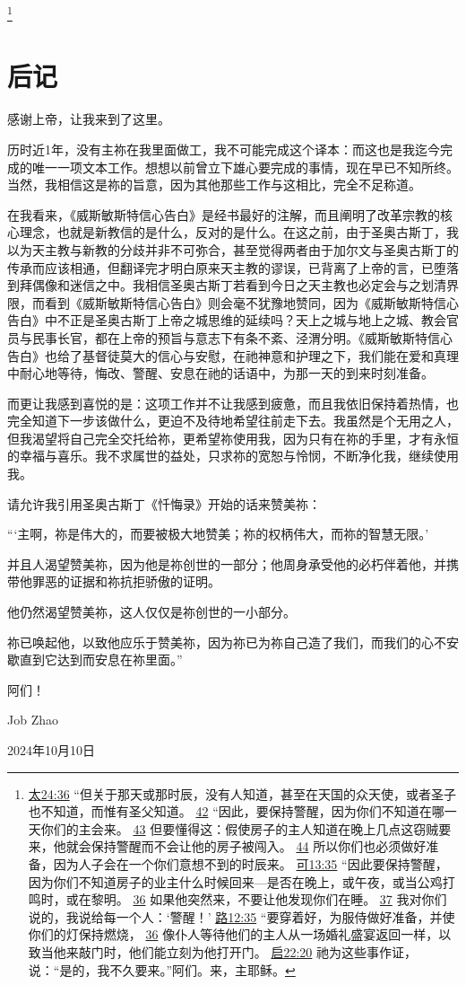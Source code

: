 \documentclass[12pt, a4paper, oneside]{ctexart}
\begin{document}
	\footnote {
		\href{https://biblehub.com/matthew/24-36.htm}{太24:36} “但关于那天或那时辰，没有人知道，甚至在天国的众天使，或者圣子也不知道，而惟有圣父知道。
		\href{https://biblehub.com/matthew/24-42.htm}{42} “因此，要保持警醒，因为你们不知道在哪一天你们的主会来。
		\href{https://biblehub.com/matthew/24-43.htm}{43} 但要懂得这：假使房子的主人知道在晚上几点这窃贼要来，他就会保持警醒而不会让他的房子被闯入。
		\href{https://biblehub.com/matthew/24-44.htm}{44} 所以你们也必须做好准备，因为人子会在一个你们意想不到的时辰来。
		\href{https://biblehub.com/mark/13-35.htm}{可13:35} “因此要保持警醒，因为你们不知道房子的业主什么时候回来---是否在晚上，或午夜，或当公鸡打鸣时，或在黎明。
		\href{https://biblehub.com/mark/13-36.htm}{36} 如果他突然来，不要让他发现你们在睡。
		\href{https://biblehub.com/mark/13-37.htm}{37} 我对你们说的，我说给每一个人：‘警醒！’
		\href{https://biblehub.com/luke/12-35.htm}{路12:35} “要穿着好，为服侍做好准备，并使你们的灯保持燃烧，
		\href{https://biblehub.com/luke/12-36.htm}{36} 像仆人等待他们的主人从一场婚礼盛宴返回一样，以致当他来敲门时，他们能立刻为他打开门。
		\href{https://biblehub.com/revelation/22-20.htm}{启22:20} 祂为这些事作证，说：“是的，我不久要来。”阿们。来，主耶稣。
	}
\thispagestyle{empty}
\newpage

\section*{后记}

感谢上帝，让我来到了这里。

历时近1年，没有主祢在我里面做工，我不可能完成这个译本：而这也是我迄今完成的唯一一项文本工作。想想以前曾立下雄心要完成的事情，现在早已不知所终。当然，我相信这是祢的旨意，因为其他那些工作与这相比，完全不足称道。

在我看来，《威斯敏斯特信心告白》是经书最好的注解，而且阐明了改革宗教的核心理念，也就是新教信的是什么，反对的是什么。在这之前，由于圣奥古斯丁，我以为天主教与新教的分歧并非不可弥合，甚至觉得两者由于加尔文与圣奥古斯丁的传承而应该相通，但翻译完才明白原来天主教的谬误，已背离了上帝的言，已堕落到拜偶像和迷信之中。我相信圣奥古斯丁若看到今日之天主教也必定会与之划清界限，而看到《威斯敏斯特信心告白》则会毫不犹豫地赞同，因为《威斯敏斯特信心告白》中不正是圣奥古斯丁上帝之城思维的延续吗？天上之城与地上之城、教会官员与民事长官，都在上帝的预旨与意志下有条不紊、泾渭分明。《威斯敏斯特信心告白》也给了基督徒莫大的信心与安慰，在祂神意和护理之下，我们能在爱和真理中耐心地等待，悔改、警醒、安息在祂的话语中，为那一天的到来时刻准备。

而更让我感到喜悦的是：这项工作并不让我感到疲惫，而且我依旧保持着热情，也完全知道下一步该做什么，更迫不及待地希望往前走下去。我虽然是个无用之人，但我渴望将自己完全交托给祢，更希望祢使用我，因为只有在祢的手里，才有永恒的幸福与喜乐。我不求属世的益处，只求祢的宽恕与怜悯，不断净化我，继续使用我。

请允许我引用圣奥古斯丁《忏悔录》开始的话来赞美祢：

“‘主啊，祢是伟大的，而要被极大地赞美；祢的权柄伟大，而祢的智慧无限。’

并且人渴望赞美祢，因为他是祢创世的一部分；他周身承受他的必朽伴着他，并携带他罪恶的证据和祢抗拒骄傲的证明。

他仍然渴望赞美祢，这人仅仅是祢创世的一小部分。

祢已唤起他，以致他应乐于赞美祢，因为祢已为祢自己造了我们，而我们的心不安歇直到它达到而安息在祢里面。”

阿们！

\hfill Job Zhao

\hfill 2024年10月10日
\end{document}
